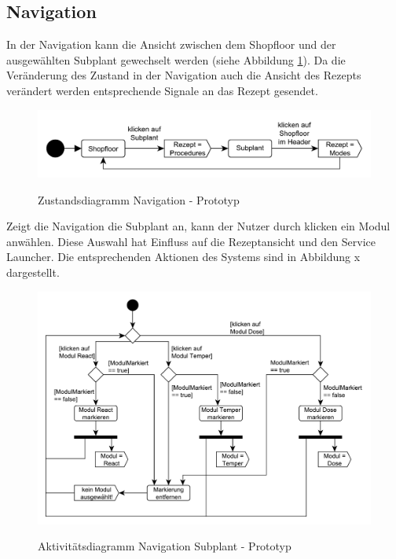 \subsection{Navigation}
In der Navigation kann die Ansicht zwischen dem Shopfloor und der ausgewählten Subplant  gewechselt werden (siehe Abbildung \ref{pic:Zustandsdiagramm-Navigation}). Da die Veränderung des Zustand in der Navigation auch die Ansicht des Rezepts verändert werden entsprechende Signale an das Rezept gesendet.
\begin{figure}[htbp]
\centering
\includegraphics[scale=0.6]{DA_files/Bilder/Prototyp/Zustandsdiagramm-Navigation.pdf}
\label{pic:Zustandsdiagramm-Navigation}
\caption{Zustandsdiagramm Navigation - Prototyp}
\end{figure}

Zeigt die Navigation die Subplant an, kann der Nutzer durch klicken ein Modul anwählen. Diese Auswahl hat Einfluss auf die Rezeptansicht und den Service Launcher. Die entsprechenden Aktionen des Systems sind in Abbildung x dargestellt.
\begin{figure}[htbp]
\centering
\includegraphics[scale=0.6]{DA_files/Bilder/Prototyp/Aktivitaetsdiagramm-Navigation-Module.pdf}
\label{pic:Aktivitaetsdiagramm-Navigation-Subplant}
\caption{Aktivitätsdiagramm Navigation Subplant - Prototyp}
\end{figure}

